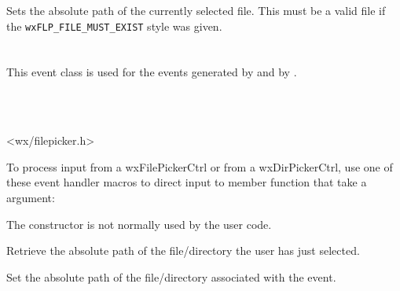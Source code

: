 Sets the absolute path of the currently selected file. This must be a valid file if
the {\tt wxFLP\_FILE\_MUST\_EXIST} style was given.




\section{}\label{wxfiledirpickerevent}

This event class is used for the events generated by
 and by .


\\
\\


<wx/filepicker.h>


To process input from a wxFilePickerCtrl or from a wxDirPickerCtrl, use one of these event handler macros to
direct input to member function that take a  argument:

\twocolwidtha{7cm}
\begin{twocollist}
\end{twocollist}%





\label{wxfiledirpickereventctor}


The constructor is not normally used by the user code.


\label{wxfiledirpickereventgetpath}


Retrieve the absolute path of the file/directory the user has just selected.


\label{wxfiledirpickereventsetpath}


Set the absolute path of the file/directory associated with the event.

